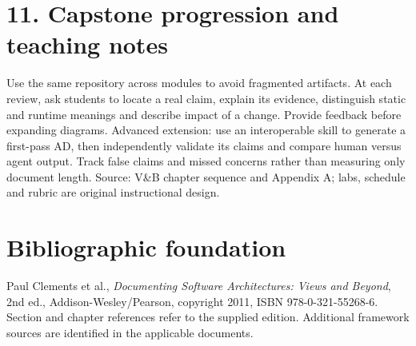 \documentclass[11pt,letterpaper]{article}
\begin{document}
\section*{11. Capstone progression and teaching notes}
Use the same repository across modules to avoid fragmented artifacts. At each review, ask students to locate a real claim, explain its evidence, distinguish static and runtime meanings and describe impact of a change. Provide feedback before expanding diagrams. Advanced extension: use an interoperable skill to generate a first-pass AD, then independently validate its claims and compare human versus agent output. Track false claims and missed concerns rather than measuring only document length. Source: V\&B chapter sequence and Appendix A; labs, schedule and rubric are original instructional design.\par\smallskip
\section*{Bibliographic foundation}
Paul Clements et al., \emph{Documenting Software Architectures: Views and Beyond}, 2nd ed., Addison-Wesley/Pearson, copyright 2011, ISBN 978-0-321-55268-6. Section and chapter references refer to the supplied edition. Additional framework sources are identified in the applicable documents.\par
\end{document}
